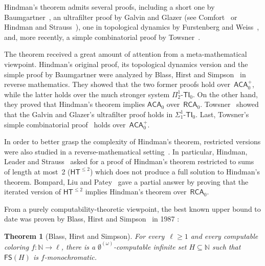 \documentclass[10pt,a4paper]{article}
\newcommand{\RCA}[0]{\mathsf{RCA}}
\newcommand{\ACA}[0]{\mathsf{ACA}}
\newcommand{\HT}[0]{\mathsf{HT}}
\newcommand{\NN}[0]{\mathbb{N}}
\newcommand{\FS}[0]{\mathsf{FS}} %
\newtheorem{theorem}{Theorem}
\numberwithin{theorem}{section}
\begin{document}
Hindman's theorem admits several proofs, including a short one by Baumgartner~\cite{baumgartnerShortProofHindmans1974}, an ultrafilter proof by Galvin and Glazer (see Comfort~\cite{comfortUltrafiltersOldNew1977} or Hindman and Strauss~\cite{hindmanAlgebraStoneCechCompactification2012}), one in topological dynamics by Furstenberg and Weiss~\cite{furstenberg1978topological}, and, more recently, a simple combinatorial proof by Towsner~\cite{towsnerSimpleProofDifficult2012}.

The theorem received a great amount of attention from a meta-mathematical viewpoint. Hindman's original proof, its topological dynamics version and the simple proof by Baumgartner were analyzed by Blass, Hirst and Simpson~\cite{blassLogicalAnalysisTheorems1987} in reverse mathematics. They showed that the two former proofs hold over~$\ACA_0^+$, while the latter holds over the much stronger system $\Pi^1_2\mbox{-}\mathsf{TI}_0$. On the other hand, they proved that Hindman's theorem implies $\ACA_0$ over~$\RCA_0$. Towsner~\cite{towsner2011hindman} showed that the Galvin and Glazer's ultrafilter proof holds in $\Sigma^1_1\mbox{-}\mathsf{TI}_0$. Last, Towsner's simple combinatorial proof~\cite{towsnerSimpleProofDifficult2012} holds over~$\ACA_0^+$. 

In order to better grasp the complexity of Hindman's theorem, restricted versions were also studied in a reverse-mathematical setting~\cite{carlucciWeakStrongRestrictions2016,carlucciWeakVariantHindman2017,carlucci2020new,dzhafarovEffectivenessHindmanTheorem2017}. In particular, Hindman, Leader and Strauss~\cite{hindman2003open} asked for a proof of Hindman's theorem restricted to sums of length at most~2 ($\HT^{\leq 2}$) which does not produce a full solution to Hindman's theorem. Bompard, Liu and Patey~\cite{bompardReverseMathematicsCarlson2022} gave a partial answer by proving that the iterated version of $\HT^{\leq 2}$ implies Hindman's theorem over~$\RCA_0$.

From a purely computability-theoretic viewpoint, the best known upper bound to date was proven by Blass, Hirst and Simpson~\cite{blassLogicalAnalysisTheorems1987} in 1987 :

\begin{theorem}[Blass, Hirst and Simpson]
For every~$\ell \geq 1$ and every computable coloring $f : \NN \to \ell$, there is a $\emptyset^{(\omega)}$-computable infinite set $H \subseteq \NN$ such that $\FS(H)$ is $f$-monochromatic.
\end{theorem}
\end{document}
